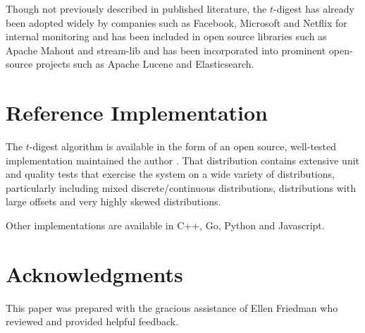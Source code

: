 \documentclass{vldb}
\begin{document}
Though not previously described in published literature, the $t$-digest has already been adopted widely by companies such as Facebook, Microsoft and Netflix for internal monitoring and has been included in open source libraries such as Apache Mahout and stream-lib and has been incorporated into prominent open-source projects such as Apache Lucene and Elasticsearch.

\section{Reference Implementation}
The $t$-digest algorithm is available in the form of an open source, well-tested implementation maintained the author \cite{t-digest-project}.  That distribution contains extensive unit and quality tests that exercise the system on a wide variety of distributions, particularly including mixed discrete/continuous distributions, distributions with large offsets and very highly skewed distributions.

Other implementations are available in C++, Go, Python and Javascript.

\section{Acknowledgments}
This paper was prepared with the gracious assistance of Ellen Friedman who reviewed and provided helpful feedback.

{}
\end{document}
